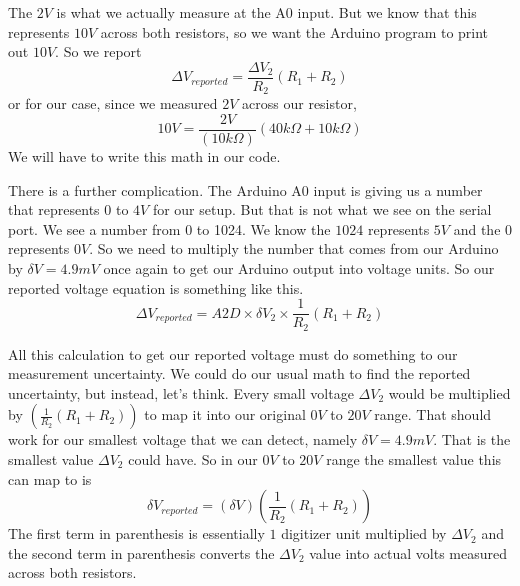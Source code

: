 The $2\unit{V}$ is what we actually measure at the A0 input. But we know
that this represents $10\unit{V}$ across both resistors, so we want the
Arduino program to print out $10\unit{V}.$ So we report%
\begin{equation*}
\Delta V_{reported}=\frac{\Delta V_{2}}{R_{2}}\left( R_{1}+R_{2}\right)
\end{equation*}%
or for our case, since we measured $2\unit{V}$ across our resistor,%
\begin{equation*}
10\unit{V}=\frac{2\unit{V}}{\left( 10\unit{k%
\Omega%
}\right) }\left( 40\unit{k%
\Omega%
}+10\unit{k%
\Omega%
}\right)
\end{equation*}%
We will have to write this math in our code. 

There is a further
complication. The Arduino A0 input is giving us a number that represents $0$
to $4\unit{V}$ for our setup. But that is not what we see on the serial
port. We see a number from 0 to 1024. We know the $1024$ represents $5\unit{V%
}$ and the $0$ represents $0\unit{V}.$ So we need to multiply the number
that comes from our Arduino by $\delta V=4.9\unit{mV}$ once again to get our
Arduino output into voltage units. So our reported voltage equation is
something like this. 
\begin{equation*}
\Delta V_{reported}=A2D\times \delta V_{2}\times \frac{1}{R_{2}}\left(
R_{1}+R_{2}\right)
\end{equation*}

All this calculation to get our reported voltage must do something to our
measurement uncertainty. We could do our usual math to find the reported
uncertainty, but instead, let's think. Every small voltage $\Delta V_{2}$
would be multiplied by $\left( \frac{1}{R_{2}}\left( R_{1}+R_{2}\right)
\right) $ to map it into our original $0\unit{V}$ to $20\unit{V}$ range.
That should work for our smallest voltage that we can detect, namely $\delta
V=4.9\unit{mV}.$ That is the smallest value $\Delta V_{2}$ could have. So in
our $0\unit{V}$ to $20\unit{V}$ range the smallest value this can map to is 
\begin{equation*}
\delta V_{reported}=\left( \delta V\right) \left( \frac{1}{R_{2}}\left(
R_{1}+R_{2}\right) \right)
\end{equation*}%
The first term in parenthesis is essentially $1$ digitizer unit multiplied
by $\Delta V_{2}$ and the second term in parenthesis converts the $\Delta
V_{2}$ value into actual volts measured across both resistors.

